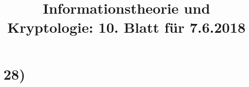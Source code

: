 %



  \title{Informationstheorie und Kryptologie: 10. Blatt für 7.6.2018}
  \maketitle

  \section*{28)}
  

